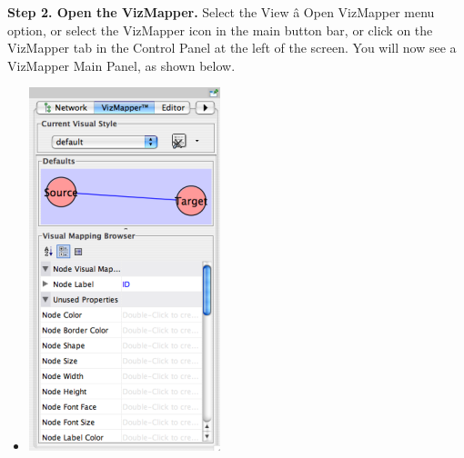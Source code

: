  \textbf{Step 2. Open the VizMapper.}
 Select the View \^a Open VizMapper menu option, or select the VizMapper icon in the main button bar, or click on the VizMapper tab in the Control Panel at the left of the screen. You will now see a VizMapper Main Panel, as shown below. 
\begin{itemize}
\item 

 \includegraphics[width=.6\textwidth]{images/NewVizMapper.png} 


\end{itemize}


